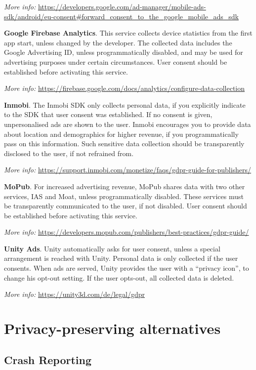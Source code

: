 \documentclass[
]{book}
\begin{document}
\emph{More info:} \url{https://developers.google.com/ad-manager/mobile-ads-sdk/android/eu-consent\#forward_consent_to_the_google_mobile_ads_sdk}

\textbf{Google Firebase Analytics}. This service collects device statistics from the first app start, unless changed by the developer. The collected data includes the Google Advertising ID, unless programmatically disabled, and may be used for advertising purposes under certain circumstances. User consent should be established before activating this service.

\emph{More info:} \url{https://firebase.google.com/docs/analytics/configure-data-collection}

\textbf{Inmobi}. The Inmobi SDK only collects personal data, if you explicitly indicate to the SDK that user consent was established. If no consent is given, unpersonalised ads are shown to the user. Inmobi encourages you to provide data about location and demographics for higher revenue, if you programmatically pass on this information. Such sensitive data collection should be transparently disclosed to the user, if not refrained from.

\emph{More info:} \url{https://support.inmobi.com/monetize/faqs/gdpr-guide-for-publishers/}

\textbf{MoPub}. For increased advertising revenue, MoPub shares data with two other services, IAS and Moat, unless programmatically disabled. These services must be transparently communicated to the user, if not disabled. User consent should be established before activating this service.

\emph{More info:} \url{https://developers.mopub.com/publishers/best-practices/gdpr-guide/}

\textbf{Unity Ads}. Unity automatically asks for user consent, unless a special arrangement is reached with Unity. Personal data is only collected if the user consents. When ads are served, Unity provides the user with a ``privacy icon'', to change his opt-out setting. If the user opts-out, all collected data is deleted.

\emph{More info:} \url{https://unity3d.com/de/legal/gdpr}

\hypertarget{privacy-preserving-alternatives}{%
\section{Privacy-preserving alternatives}\label{privacy-preserving-alternatives}}

\hypertarget{crash-reporting}{%
\subsection{Crash Reporting}\label{crash-reporting}}
\end{document}
